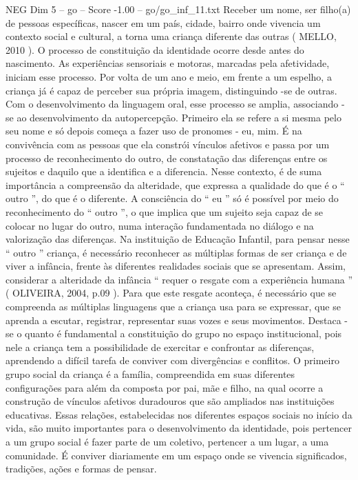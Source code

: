 \begin{textsample}{NEG Dim 5 – go – Score -1.00 – go/go\_inf\_11.txt}
Receber um nome, ser filho(a) de pessoas específicas, nascer em um país, cidade, bairro onde vivencia um contexto social e cultural, a torna uma criança diferente das outras ( MELLO, 2010 ).
O processo de constituição da identidade ocorre desde antes do nascimento.
As experiências sensoriais e motoras, marcadas pela afetividade, iniciam esse processo.
Por volta de um ano e meio, em frente a um espelho, a criança já é capaz de perceber sua própria imagem, distinguindo -se de outras.
Com o desenvolvimento da linguagem oral, esse processo se amplia, associando -se ao desenvolvimento da autopercepção.
Primeiro ela se refere a si mesma pelo seu nome e só depois começa a fazer uso de pronomes - eu, mim.
É na convivência com as pessoas que ela constrói vínculos afetivos e passa por um processo de reconhecimento do outro, de constatação das diferenças entre os sujeitos e daquilo que a identifica e a diferencia.
Nesse contexto, é de suma importância a compreensão da alteridade, que expressa a qualidade do que é o “ outro ”, do que é o diferente.
A consciência do “ eu ” só é possível por meio do reconhecimento do “ outro ”, o que implica que um sujeito seja capaz de se colocar no lugar do outro, numa interação fundamentada no diálogo e na valorização das diferenças.
Na instituição de Educação Infantil, para pensar nesse “ outro ” criança, é necessário reconhecer as múltiplas formas de ser criança e de viver a infância, frente às diferentes realidades sociais que se apresentam.
Assim, considerar a alteridade da infância “ requer o resgate com a experiência humana ” ( OLIVEIRA, 2004, p.09 ).
Para que este resgate aconteça, é necessário que se compreenda as múltiplas linguagens que a criança usa para se expressar, que se aprenda a escutar, registrar, representar suas vozes e seus movimentos.
Destaca -se o quanto é fundamental a constituição do grupo no espaço institucional, pois nele a criança tem a possibilidade de exercitar e confrontar as diferenças, aprendendo a difícil tarefa de conviver com divergências e conflitos.
O primeiro grupo social da criança é a família, compreendida em suas diferentes configurações para além da composta por pai, mãe e filho, na qual ocorre a construção de vínculos afetivos duradouros que são ampliados nas instituições educativas.
Essas relações, estabelecidas nos diferentes espaços sociais no início da vida, são muito importantes para o desenvolvimento da identidade, pois pertencer a um grupo social é fazer parte de um coletivo, pertencer a um lugar, a uma comunidade.
É conviver diariamente em um espaço onde se vivencia significados, tradições, ações e formas de pensar.

\end{textsample}
